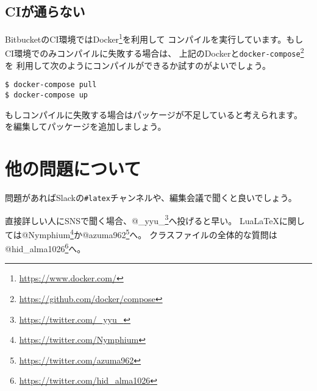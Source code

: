 \documentclass[../../main]{subfiles}
\begin{document}
\subsection{CIが通らない}

BitbucketのCI環境ではDocker\footnote{\url{https://www.docker.com/}}を利用して
コンパイルを実行しています。もしCI環境でのみコンパイルに失敗する場合は、
上記のDockerと\lstinline|docker-compose|\footnote{\url{https://github.com/docker/compose}}を
利用して次のようにコンパイルができるか試すのがよいでしょう。

\begin{lstlisting}
$ docker-compose pull
$ docker-compose up
\end{lstlisting}

もしコンパイルに失敗する場合はパッケージが不足していると考えられます。
を編集してパッケージを追加しましょう。

\section{他の問題について}

問題があればSlackの\texttt{\#latex}チャンネルや、編集会議で聞くと良いでしょう。

直接詳しい人にSNSで聞く場合、@\_yyu\_\footnote{\url{https://twitter.com/_yyu_}}へ投げると早い。
Lua\LaTeX に関しては@Nymphium\footnote{\url{https://twitter.com/Nymphium}}か@azuma962\footnote{\url{https://twitter.com/azuma962}}へ。
クラスファイルの全体的な質問は@hid\_alma1026\footnote{\url{https://twitter.com/hid_alma1026}}へ。

\end{document}
